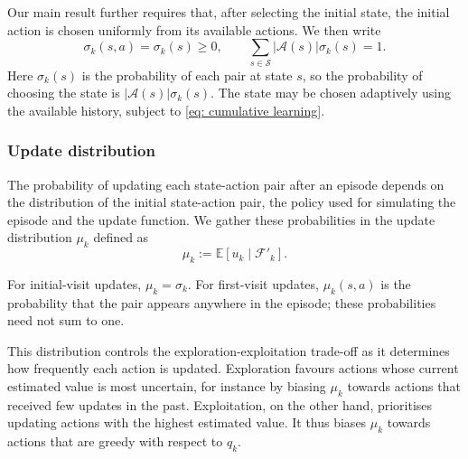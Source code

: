 Our main result further requires that, after selecting the initial state, the initial action is chosen uniformly from its available actions. We then write
\begin{equation}
\label{eq: uniform starts}
\sigma_k(s,a)=\sigma_k(s)\ge0,
\qquad
\sum_{s\in\mathcal S}|\mathcal A(s)|\sigma_k(s)=1.
\end{equation}
Here $\sigma_k(s)$ is the probability of each pair at state $s$, so the probability of choosing the state is $|\mathcal A(s)|\sigma_k(s)$. The state may be chosen adaptively using the available history, subject to \eqref{eq: cumulative learning}.

\subsubsection{Update distribution}

The probability of updating each state-action pair after an episode depends on the distribution of the initial state-action pair, the policy used for simulating the episode and the update function.
We gather these probabilities in the update distribution $\mu_k$ defined as
\[
\mu_k := \mathbb E [ u_k \mid \mathcal F'_k] .
\]






For initial-visit updates, $\mu_k=\sigma_k$. For first-visit updates, $\mu_k(s,a)$ is the probability that the pair appears anywhere in the episode; these probabilities need not sum to one.

This distribution controls the exploration-exploitation trade-off
as it determines how frequently each action is updated.
Exploration favours actions whose current estimated value is most uncertain, for instance by biasing $\mu_k$ towards actions that received few updates in the past.
Exploitation, on the other hand, prioritises updating actions with the highest estimated value. It thus biases $\mu_k$ towards actions that are greedy with respect to $q_k$.


